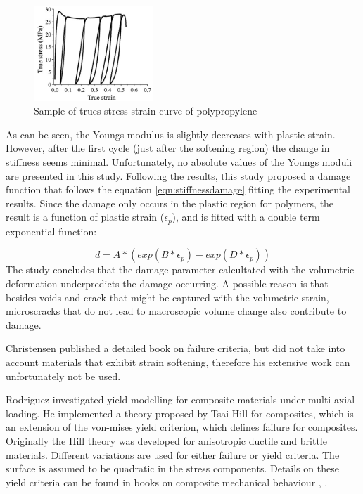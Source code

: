 \begin{figure}[H]
    \centering
    \includegraphics[width=0.4\textwidth]{chapter_2/figures/damagepolymer.png}
    \caption{Sample of trues stress-strain curve of polypropylene\cite{Gu2013ExperimentalThermoplastics} }
    \label{fig:damagepolymer}
\end{figure}
As can be seen, the Youngs modulus is slightly decreases with plastic strain. However, after the first cycle (just after the softening region) the change in stiffness seems minimal.  Unfortunately, no absolute values of the Youngs moduli are presented in this study. 
Following the results, this study proposed a damage function that follows the equation \ref{eqn:stiffnessdamage} fitting the experimental results. Since the damage only occurs in the plastic region for polymers, the result is a function of plastic strain ($\epsilon_p$), and is fitted with a double term exponential function:

\begin{equation}\label{AzziTsai}
d=A*(exp(B*\epsilon_p)-exp(D*\epsilon_p))
\end{equation}The study concludes that the damage parameter calcultated with the volumetric deformation underpredicts the damage occurring. A possible reason is that besides voids and crack that might be captured with the volumetric strain, microscracks that do not lead to macroscopic volume change also contribute to damage. 

Christensen \cite{Christensen2013TheFailure}  published a detailed book on failure criteria, but did not take into account materials that exhibit strain softening, therefore his extensive work can unfortunately not be used. 



Rodriguez \cite{Rodriguez2003MechanicalModeling} investigated yield modelling for composite materials under multi-axial loading. He implemented a theory proposed by Tsai-Hill for composites, which is an extension of the von-mises yield criterion, which defines failure for composites. Originally the Hill theory was developed for anisotropic ductile and brittle materials. Different variations are used for either failure or yield criteria. The  surface is assumed to be quadratic in the stress components. Details on these yield criteria can be found in books on composite mechanical behaviour \cite{Ishai2006EngineeringMaterials}, \cite{Mallick2007Fiber-Composites}.


